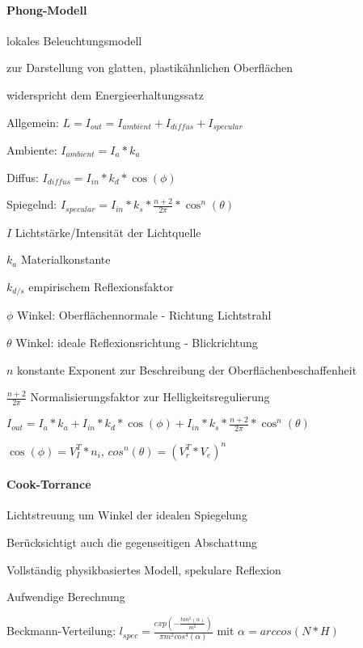 \documentclass[landscape]{article}
\begin{document}
\begin{multicols}{3}
  \paragraph{Phong-Modell}
  \begin{itemize*}
    \item lokales Beleuchtungsmodell
    \item zur Darstellung von glatten, plastikähnlichen Oberflächen
    \item widerspricht dem Energieerhaltungssatz
    \item Allgemein: $L=I_{out}=I_{ambient}+I_{diffus}+I_{specular}$
    \item Ambiente: $I_{ambient}=I_a * k_a$
    \item Diffus: $I_{diffus}=I_{in}*k_d*\cos(\phi)$
    \item Spiegelnd: $I_{specular}=I_{in}*k_s*\frac{n+2}{2\pi}*\cos^n({\theta})$
    \begin{itemize*}
      \item $I$ Lichtstärke/Intensität der Lichtquelle
      \item $k_a$ Materialkonstante
      \item $k_{d/s}$ empirischem Reflexionsfaktor
      \item $\phi$ Winkel: Oberflächennormale - Richtung Lichtstrahl
      \item $\theta$ Winkel: ideale Reflexionsrichtung - Blickrichtung
      \item $n$ konstante Exponent zur Beschreibung der Oberflächenbeschaffenheit
    \end{itemize*}
    \item $\frac{n+2}{2\pi}$ Normalisierungsfaktor zur Helligkeitsregulierung
    \item $I_{out}=I_a*k_a+I_{in}*k_d*\cos(\phi)+I_{in}*k_s*\frac{n+2}{2\pi}*\cos^n(\theta)$
    \item $\cos(\phi)=V^T_I*n_i$, $cos^n(\theta)=(V^T_r * V_e)^n$
  \end{itemize*}
  
  \paragraph{Cook-Torrance}
  \begin{itemize*}
    \item Lichtstreuung um Winkel der idealen Spiegelung
    \item Berücksichtigt auch die gegenseitigen Abschattung
    \item Vollständig physikbasiertes Modell, spekulare Reflexion
    \item Aufwendige Berechnung
    \item Beckmann-Verteilung: $l_{spec}=\frac{exp(-\frac{tan^2(\alpha)}{m^2})}{\pi m^2 cos^4 (\alpha)}$ mit $\alpha=arccos(N*H)$
  \end{itemize*}
  
\end{multicols}
\end{document}
